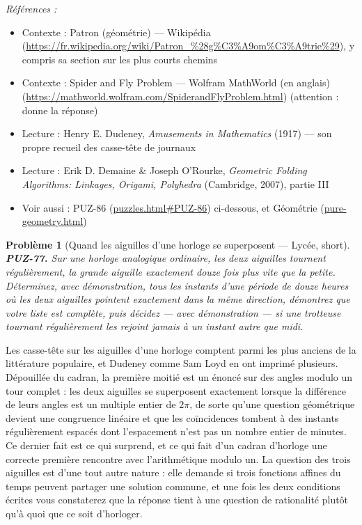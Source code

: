 \documentclass[11pt]{article}
\newtheorem{problem}{Problème}
\newenvironment{refs}{\par\small\noindent\emph{Références :}\begin{itemize}\setlength\itemsep{0pt}}{\end{itemize}\normalsize}
\begin{document}
\begin{refs}
\item Contexte : Patron (géométrie) --- Wikipédia (\url{https://fr.wikipedia.org/wiki/Patron_%28g%C3%A9om%C3%A9trie%29}), y compris sa section sur les plus courts chemins
\item Contexte : Spider and Fly Problem --- Wolfram MathWorld (en anglais) (\url{https://mathworld.wolfram.com/SpiderandFlyProblem.html}) (attention : donne la réponse)
\item Lecture : Henry E. Dudeney, \textit{Amusements in Mathematics} (1917) --- son propre recueil des casse-tête de journaux
\item Lecture : Erik D. Demaine \& Joseph O'Rourke, \textit{Geometric Folding Algorithms: Linkages, Origami, Polyhedra} (Cambridge, 2007), partie III
\item Voir aussi : PUZ-86 (\url{puzzles.html#PUZ-86}) ci-dessous, et Géométrie (\url{pure-geometry.html})
\end{refs}

\bigskip

\begin{problem}[{Quand les aiguilles d'une horloge se superposent --- Lycée, short}]
\textbf{PUZ-77.} Sur une horloge analogique ordinaire, les deux
aiguilles tournent régulièrement, la grande aiguille exactement douze fois plus vite que la
petite. Déterminez, avec démonstration, tous les instants d'une période de douze heures où
les deux aiguilles pointent exactement dans la même direction, démontrez que votre liste est
complète, puis décidez --- avec démonstration --- si une trotteuse tournant régulièrement les
rejoint jamais à un instant autre que midi.
\end{problem}

\noindent Les casse-tête sur les aiguilles d'une horloge comptent parmi les plus
anciens de la littérature populaire, et Dudeney comme Sam Loyd en ont imprimé plusieurs.
Dépouillée du cadran, la première moitié est un énoncé sur des angles modulo un tour complet :
les deux aiguilles se superposent exactement lorsque la différence de leurs angles est un
multiple entier de $ 2\pi $, de sorte qu'une question géométrique devient une congruence
linéaire et que les coïncidences tombent à des instants régulièrement espacés dont
l'espacement n'est pas un nombre entier de minutes. Ce dernier fait est ce qui surprend, et
ce qui fait d'un cadran d'horloge une correcte première rencontre avec l'arithmétique modulo
un. La question des trois aiguilles est d'une tout autre nature : elle demande si trois
fonctions affines du temps peuvent partager une solution commune, et une fois les deux
conditions écrites vous constaterez que la réponse tient à une question de rationalité
plutôt qu'à quoi que ce soit d'horloger.
\end{document}
